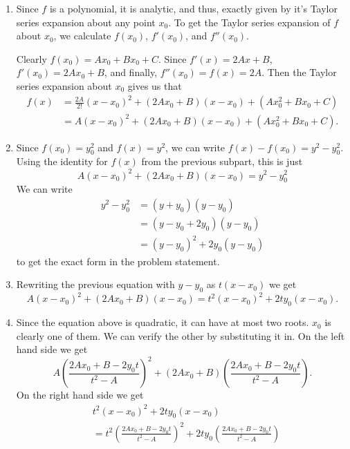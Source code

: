 \documentclass[12 pt, letterpaper]{hmcpset}
\begin{document}
\begin{solution}
	\begin{enumerate}
		\item Since $f$ is a polynomial, it is analytic, and thus, exactly given by it's Taylor series expansion about any point $x_{0}$. To get the Taylor series expansion of $f$ about $x_{0}$, we calculate $f(x_{0})$, $f'(x_{0})$, and $f''(x_{0})$.

			Clearly $f(x_{0}) = A x_{0} + B x_{0} + C$. Since  $f'(x) = 2 A x + B$, $f'(x_{0}) = 2 A x_{0} + B$, and finally, $f''(x_{0}) = f(x) = 2 A$. Then the Taylor series expansion about $x_{0}$ gives us that
			\[
				\begin{split}
					f(x) & = \frac{2A}{2!} (x - x_{0})^{2} + (2 A x_{0} + B) (x - x_{0}) + (A x_{0}^{2} + B x_{0} + C) \\
					     & = A (x - x_{0})^{2} + (2 A x_{0} + B) (x - x_{0}) + (A x_{0}^{2} + B x_{0} + C).
				\end{split}
			\]
		\item Since $f(x_{0}) = y_{0}^{2}$ and $f(x) = y^{2}$, we can write $f(x) - f(x_{0}) = y^{2} - y_{0}^{2}$. Using the identity for $f(x)$ from the previous subpart, this is just
			\[
				A(x - x_{0})^{2} + (2 A x_{0} + B)(x - x_{0}) = y^{2} - y_{0}^{2}
			\]
			We can write
			\[
				\begin{split}
					y^{2} - y_{0}^{2} & = (y + y_{0})(y - y_{0}) \\
							  & = (y - y_{0} + 2 y_{0})(y - y_{0}) \\
							  & = (y - y_{0})^{2} + 2y_{0}(y - y_{0})
				\end{split}
			\]
			to get the exact form in the problem statement.
		\item Rewriting the previous equation with $y - y_{0}$ as $t(x - x_{0})$ we get
			\[
				A(x - x_{0})^{2} + (2 A x_{0} + B)(x - x_{0})  = t^{2}(x - x_{0})^{2} + 2t y_{0} (x - x_{0}).	
			\]
		\item Since the equation above is quadratic, it can have at most two roots. $x_{0}$ is clearly one of them. We can verify the other by substituting it in. On the left hand side we get
			\[
				A \left (\frac{2 A x_{0} + B - 2 y_{0}t}{t^{2} - A} \right )^{2} + (2 A x_{0} + B) \left ( \frac{2 A x_{0} + B - 2 y_{0} t}{t^{2} - A} \right ).
			\]
			On the right hand side we get
			\[
				\begin{split}
					& t^{2} (x - x_{0})^{2} + 2t y_{0} (x - x_{0}) \\
					& = t^{2} \left ( \frac{2 A x_{0} + B - 2 y_{0} t}{t^{2} - A} \right )^{2} + 2 t y_{0} \left ( \frac{2 A x_{0} + B - 2 y_{0} t}{t^{2} - A} \right ) \\

\end{split}\]
\end{enumerate}
\end{solution}
\end{document}
